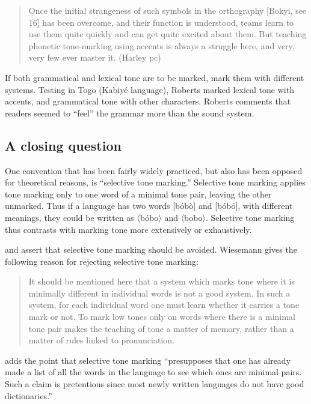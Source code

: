 \documentclass[output=paper]{langscibook}
\begin{document}
\begin{quote}
Once the initial strangeness of such symbols in the orthography [Bokyi, see 16] has been overcome, and their function is understood, teams learn to use them quite quickly and can get quite excited about them. But teaching phonetic tone-marking using accents is always a struggle here, and very, very few ever master it. (Harley pc)
\end{quote}

If both grammatical and lexical tone are to be marked, mark them with different systems. Testing in Togo (Kabiyé language), Roberts marked lexical tone with accents, and grammatical tone with other characters. Roberts comments that readers seemed to “feel” the grammar more than the sound system. 

\subsection{A closing question}
\label{sec:Conclusion:ClosingQuestion:2}
One convention that has been fairly widely practiced, but also has been opposed for theoretical reasons, is “selective tone marking.” Selective tone marking applies tone marking only to one word of a minimal tone pair, leaving the other unmarked. Thus if a language has two words [bóbò] and [bóbó], with different meanings, they could be written as 〈bóbo〉 and 〈bobo〉. Selective tone marking thus contrasts with marking tone more extensively or exhaustively.

\citet[16]{Wiesemann1989} and \citet[132--133]{Longacre1953} assert that selective tone marking should be avoided. Wiesemann gives the following reason for rejecting selective tone marking:

\begin{quote}
It should be mentioned here that a system which marks tone where it is minimally different in individual words is not a good system. In such a system, for each individual word one must learn whether it carries a tone mark or not. To mark low tones only on words where there is a minimal tone pair makes the teaching of tone a matter of memory, rather than a matter of rules linked to pronunciation.
\end{quote}

\citet[133]{Longacre1953} adds the point that selective tone marking “presupposes that one has already made a list of all the words in the language to see which ones are minimal pairs. Such a claim is pretentious since most newly written languages do not have good dictionaries.” 
\end{document}
